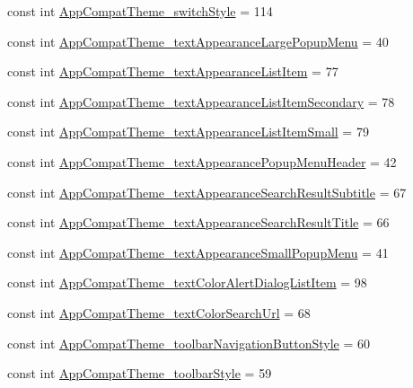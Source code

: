 \begin{CompactItemize}
\item 
const int \hyperlink{class__2doo_1_1_droid_1_1_resource_1_1_styleable_23d715d537051da6047aa75eb32b03ca}{AppCompatTheme\_\-switchStyle} = 114
\item 
const int \hyperlink{class__2doo_1_1_droid_1_1_resource_1_1_styleable_9f61f6d5daaa0935ce50fc6f5f534ae6}{AppCompatTheme\_\-textAppearanceLargePopupMenu} = 40
\item 
const int \hyperlink{class__2doo_1_1_droid_1_1_resource_1_1_styleable_a07d471f37b0764742fa42f33a717a6e}{AppCompatTheme\_\-textAppearanceListItem} = 77
\item 
const int \hyperlink{class__2doo_1_1_droid_1_1_resource_1_1_styleable_3b0aacef98d6f2260840b83b5db4f9be}{AppCompatTheme\_\-textAppearanceListItemSecondary} = 78
\item 
const int \hyperlink{class__2doo_1_1_droid_1_1_resource_1_1_styleable_433e848a2a4f84c81d6a3d5fe5d8231c}{AppCompatTheme\_\-textAppearanceListItemSmall} = 79
\item 
const int \hyperlink{class__2doo_1_1_droid_1_1_resource_1_1_styleable_65ab1271b842ad51c21201d76c379a73}{AppCompatTheme\_\-textAppearancePopupMenuHeader} = 42
\item 
const int \hyperlink{class__2doo_1_1_droid_1_1_resource_1_1_styleable_00be00fd4a020be774d5ed7f6f2f5049}{AppCompatTheme\_\-textAppearanceSearchResultSubtitle} = 67
\item 
const int \hyperlink{class__2doo_1_1_droid_1_1_resource_1_1_styleable_4512c0f91e8888977c4bc9b443435f69}{AppCompatTheme\_\-textAppearanceSearchResultTitle} = 66
\item 
const int \hyperlink{class__2doo_1_1_droid_1_1_resource_1_1_styleable_57e56d8b2c893c2660ab189cc6c0f333}{AppCompatTheme\_\-textAppearanceSmallPopupMenu} = 41
\item 
const int \hyperlink{class__2doo_1_1_droid_1_1_resource_1_1_styleable_2e66d30d76efd92830d3179e97ef6d8d}{AppCompatTheme\_\-textColorAlertDialogListItem} = 98
\item 
const int \hyperlink{class__2doo_1_1_droid_1_1_resource_1_1_styleable_4ce586e33de46ceb7e608baf89394ebd}{AppCompatTheme\_\-textColorSearchUrl} = 68
\item 
const int \hyperlink{class__2doo_1_1_droid_1_1_resource_1_1_styleable_f892321a6296ffd5887f2951e33db402}{AppCompatTheme\_\-toolbarNavigationButtonStyle} = 60
\item 
const int \hyperlink{class__2doo_1_1_droid_1_1_resource_1_1_styleable_ffb8e48037988a96ced022d0a1a26bcb}{AppCompatTheme\_\-toolbarStyle} = 59

\end{CompactItemize}
